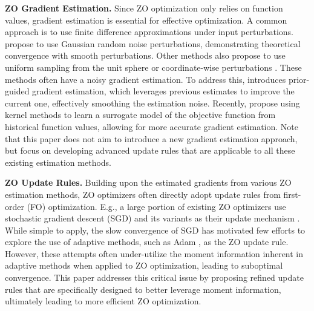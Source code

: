 \textbf{ZO Gradient Estimation.} Since ZO optimization only relies on function values, gradient estimation is essential for effective optimization. A common approach is to use finite difference approximations under input perturbations. \citet{Nesterov2017} propose to use Gaussian random noise perturbations, demonstrating theoretical convergence with smooth perturbations. Other methods also propose to use uniform sampling from the unit sphere \citep{bsg} or coordinate-wise perturbations \citep{coordinate}. These methods often have a noisy gradient estimation. To address this, \citep{prgf} introduces prior-guided gradient estimation, which leverages previous estimates to improve the current one, effectively smoothing the estimation noise. Recently, \citep{zord, fzoos} propose using kernel methods to learn a surrogate model of the objective function from historical function values, allowing for more accurate gradient estimation. Note that this paper does not aim to introduce a new gradient estimation approach, but focus on developing advanced update rules that are applicable to all these existing estimation methods.

\textbf{ZO Update Rules.} Building upon the estimated gradients from various ZO estimation methods, ZO optimizers often directly adopt update rules from first-order (FO) optimization. E.g., a large portion of existing ZO optimizers use stochastic gradient descent (SGD) and its variants as their update mechanism \citep{GhadimiL13a, GhadimiLZ16, Nesterov2017, 0001LCHA18, 0001KCTCA18, prgf, zord}. While simple to apply, the slow convergence of SGD has motivated few efforts \cite{zo-adamm, nazari2020adaptive, adamu} to explore the use of adaptive methods, such as Adam \citep{adam}, as the ZO update rule. However, these attempts often under-utilize the moment information inherent in adaptive methods when applied to ZO optimization, leading to suboptimal convergence. This paper addresses this critical issue by proposing refined update rules that are specifically designed to better leverage moment information, ultimately leading to more efficient ZO optimization.





